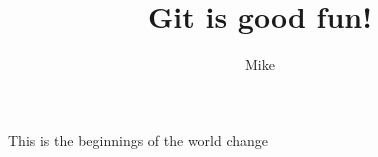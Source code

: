 \documentclass[10pt]{article}
\author{Mike}
\title{Git is good fun!}
\begin{document}
	\maketitle
	
	This is the beginnings of the world change
\end{document}

